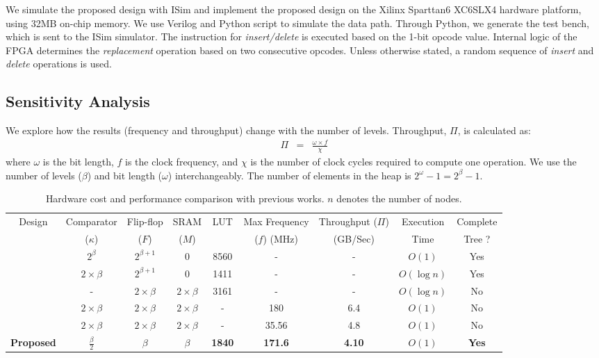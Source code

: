 We simulate the proposed design with ISim and implement the proposed design on the Xilinx Sparttan6 XC6SLX4 hardware platform, using 32MB on-chip memory.
We use Verilog and Python script to simulate the data path.
Through Python, we generate the test bench, which is sent to the ISim simulator.
The instruction for {\it insert/delete} is executed based on the 1-bit opcode value.
Internal logic of the FPGA determines the {\it replacement} operation based on two consecutive opcodes.
Unless otherwise stated, a random sequence of {\it insert} and {\it delete} operations is used.

\subsection{Sensitivity Analysis}
We explore how the results (frequency and throughput) change with the number of levels.
Throughput, $\Pi$, is calculated as:
\begin{eqnarray}
\Pi &=&  \frac{\omega \times  f}{\chi}
\end{eqnarray}
 where $\omega$ is the bit length, $f$ is the clock frequency, and $\chi$ is the number of clock cycles required to compute one operation.
We use the number of levels ($\beta$) and bit length ($\omega$) interchangeably.
The number of elements in the heap is $2^\omega-1 = 2^\beta -1$.

\begin{table}
 \begin{center}
 \caption{Hardware cost and performance comparison with previous works. $n$ denotes the number of nodes.}
\label{table4}
\begin{tabular}{ |c|c|c|c|c|c|c|c|c| }
 \hline
 Design  & Comparator  & Flip-flop & SRAM & LUT &Max Frequency & Throughput ($\Pi$) & Execution & Complete \\
  & ($\kappa$)& ($F$)& ($M$) &  & ($f$) (MHz) & (GB/Sec) & Time & Tree ?\\
 \hline
 \hline
 \cite{hw8} & $2^\beta$ & $2^{\beta +1}$& 0 & 8560 & - & - & $O(1)$ & Yes\\
 \hline
 \cite{fpga2} & $2 \times \beta$ & $2^{\beta +1}$ & 0 & 1411 & - & - & $O(\log n)$ & Yes\\
 \hline
 \cite{hwsw1} & - & $2 \times \beta$ & $2 \times \beta$ & 3161 & - & - & $O(\log n)$ & No\\
 \hline
 \cite{fpga1} & $2 \times \beta$ & $2 \times \beta$ & $2 \times \beta$ & - & 180 &6.4 & $O(1)$ & No\\
 \hline
 \cite{hw2} & $2 \times \beta$ & $2 \times \beta$ & $2 \times \beta$ & - & 35.56 &4.8 & $O(1)$ & No\\
 \hline 
{\bf Proposed} & {\bf $\frac{\beta}{2}$} & {\bf $\beta$} & {\bf $\beta$} & {\bf 1840} & {\bf 171.6} & {\bf 4.10} & {\bf $O(1)$} & {\bf Yes}\\
 \hline
\end{tabular}
\end{center}
\end{table}

